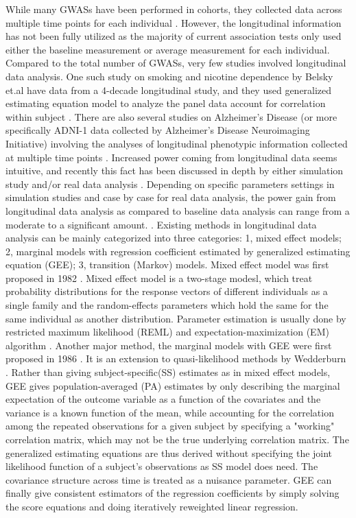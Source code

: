 \documentclass[12pt]{article}
\begin{document}
While many GWASs have been performed in cohorts, they collected data across multiple time points for each individual \cite{Aulchenko2009,Ionita-Laza2007,Kamatani2010,Kathiresan2007,Sabatti2008}. However, the longitudinal information has not been fully utilized as the majority of current association tests only used either the baseline measurement or average measurement for each individual\cite{Sabatti2008,Ionita-Laza2007,Kamatani2010,Kathiresan2007}. Compared to the total number of GWASs, very few studies involved longitudinal data analysis. One such study on smoking and nicotine dependence by Belsky et.al have data from a 4-decade longitudinal study, and they used generalized estimating equation model to analyze the panel data account for correlation within subject \cite{Belsky2013}. There are also several studies on Alzheimer's Disease (or more specifically ADNI-1 data collected by Alzheimer's Disease Neuroimaging Initiative) involving the analyses of longitudinal phenotypic information collected at multiple time points \cite{Wang2012,Melville2012,Silver2012}. Increased power coming from longitudinal data seems intuitive, and recently this fact has been discussed in depth by either simulation study and/or real data analysis \cite{Xu2014,Furlotte2012}. Depending on specific parameters settings in simulation studies and case by case for real data analysis, the power gain from longitudinal data analysis as compared to baseline data analysis can range from a moderate to a significant amount. \cite{Xu2014,Furlotte2012}. Existing methods in longitudinal data analysis can be mainly categorized into three categories: 1, mixed effect models; 2, marginal models with regression coefficient estimated by generalized estimating equation (GEE); 3, transition (Markov) models. Mixed effect model was first proposed in 1982 \cite{laird1982random}. Mixed effect model is a two-stage modesl, which treat probability distributions for the response vectors of different individuals as a single family and the random-effects parameters which hold the same for the same individual as another distribution. Parameter estimation is usually done by restricted maximum likelihood (REML) and expectation-maximization (EM) algorithm \cite{laird1982random}. Another major method, the marginal models with GEE were first proposed in 1986 \cite{zeger1986longitudinal,liang1986longitudinal}. It is an extension to quasi-likelihood methods by Wedderburn \cite{wedderburn1974quasi}. Rather than giving subject-specific(SS) estimates as in mixed effect models, GEE gives population-averaged (PA) estimates by only describing the marginal expectation of the outcome variable as a function of the covariates and the variance is a known function of the mean, while accounting for the correlation among the repeated observations for a given subject by specifying a "working" correlation matrix, which may not be the true underlying correlation matrix. The generalized estimating equations are thus derived without specifying the joint likelihood function of a subject's observations as SS model does need. The covariance structure across time is treated as a nuisance parameter. GEE can finally give consistent estimators of the regression coefficients by simply solving the score equations and doing iteratively reweighted linear regression. 
\end{document}
